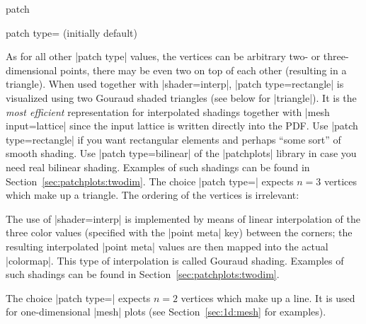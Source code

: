 {\begin{plottype}[/pgfplots]{patch}
\begin{pgfplotskey}{patch type= (initially default)}
\begin{codeexample}[]
\end{codeexample}
        \noindent As for all other |patch type| values, the vertices can be
        arbitrary two- or three-dimensional points, there may be even two on
        top of each other (resulting in a triangle). When used together with
        |shader=interp|, |patch type=rectangle| is visualized using two Gouraud
        shaded triangles (see below for |triangle|). It is the \emph{most
        efficient} representation for interpolated shadings together with
        |mesh input=lattice| since the input lattice is written directly into
        the PDF. Use |patch type=rectangle| if you want rectangular elements
        and perhaps ``some sort'' of smooth shading. Use |patch type=bilinear|
        of the |patchplots| library in case you need real bilinear shading.
        Examples of such shadings can be found in
        Section~\ref{sec:patchplots:twodim}. The choice
        |patch type=| expects $n=3$ vertices which
        make up a triangle. The ordering of the vertices is irrelevant:
\begin{codeexample}[]
\end{codeexample}
        \noindent The use of |shader=interp| is implemented by means of linear
        interpolation of the three color values (specified with the
        |point meta| key) between the corners; the resulting interpolated
        |point meta| values are then mapped into the actual |colormap|. This
        type of interpolation is called Gouraud shading. Examples of such
        shadings can be found in Section~\ref{sec:patchplots:twodim}.

        The choice |patch type=| expects $n=2$ vertices
        which make up a line. It is used for one-dimensional |mesh| plots (see
        Section~\ref{sec:1d:mesh} for examples).


\end{pgfplotskey}
\end{plottype}}
